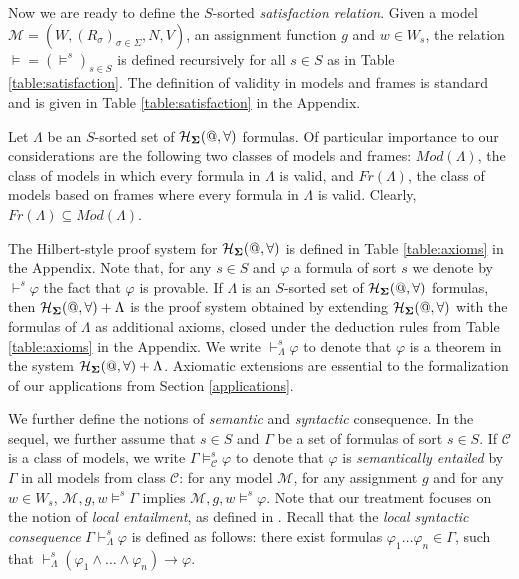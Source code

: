 \documentclass{easychair}
\theoremstyle{remark}
\begin{document}
Now we are ready to define the $S$-sorted  \textit{satisfaction relation}. Given a model $\mathcal{M} = (W, (R_\sigma)_{\sigma \in \Sigma}, N, V)$, an assignment function $g$ and $w \in W_s$, the relation 
  $\vDash=(\vDash^s)_{s\in S}$ is defined recursively for all $s \in S$ as in Table
\ref{table:satisfaction}. 
 The definition of validity in models and frames is standard and is given in Table \ref{table:satisfaction} in the Appendix.

Let $\Lambda$ be an $S$-sorted set of $\mathcal{H}_{\bf \Sigma}(@, \forall)$ formulas. Of particular importance to our considerations are the following two classes of models and frames: $Mod(\Lambda)$, the class of models in which every formula in $\Lambda$ is valid, and  $Fr(\Lambda)$,   the class of models based on frames where every formula in $\Lambda$ is valid. Clearly, $Fr(\Lambda) \subseteq Mod(\Lambda)$.

The Hilbert-style proof system for $\mathcal{H}_{\bf \Sigma}(@, \forall)$ is defined in Table \ref{table:axioms} in the Appendix. Note that, for any $s\in S$ and $\varphi$ a formula of sort $s$ we denote by $\vdash^s\varphi$ the fact that $\varphi$ is provable. If $\Lambda$ is an $S$-sorted set of $\mathcal{H}_{\bf \Sigma}(@, \forall)$ formulas, then  $\mathcal{H}_{\bf \Sigma}(@, \forall) + \Lambda$ is the proof system obtained by extending $\mathcal{H}_{\bf \Sigma}(@, \forall)$ with the formulas of  $\Lambda$ as additional axioms, closed under the deduction rules from Table \ref{table:axioms} in the Appendix. We write $\vdash^s_{\Lambda} \varphi$ to denote that $\varphi$ is a theorem in the system 
$\mathcal{H}_{\bf \Sigma}(@, \forall) + \Lambda$. Axiomatic extensions are essential to the formalization of our applications from Section \ref{applications}.  

We further define the notions of \textit{semantic} and \textit{syntactic} consequence. In the sequel, we further assume that $s\in S$ and   $\Gamma$ be a set of formulas of sort $s \in S$. 
If $\mathcal{C}$ is a class of models,   we write $\Gamma \vDash^s_{\mathcal{C}} \varphi$ to denote that $\varphi$ is \textit{semantically entailed} by $\Gamma$ in all models from class  $\mathcal{C}$: for any model $\mathcal M$, for any assignment $g$ and for any $w\in W_s$, 
${\mathcal M},g,w\vDash^s \Gamma$ implies ${\mathcal M},g,w\vDash^s \varphi$. 
Note that our treatment focuses on the notion of \textit{local entailment}, as defined in \cite[1.5]{mod}. Recall that the \textit{local syntactic consequence}  $\Gamma \vdash^s_\Lambda \varphi$ is defined as follows: there exist formulas $\varphi_1 \dots \varphi_n \in \Gamma$, such that $\vdash^s_\Lambda (\varphi_1 \wedge \dots \wedge \varphi_n) \to \varphi$.  
 
\end{document}
